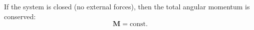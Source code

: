 If the system is closed (no external forces), then the total angular momentum is conserved:
$$\mathbf{M} = \text{const}.$$
